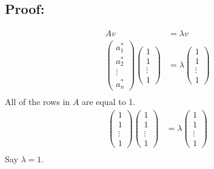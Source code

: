 \documentclass[fleqn]{article}
\begin{document}
\subsection*{Proof: }
\begin{equation*}
    \begin{split}
        Av&=\lambda v\\
        \begin{pmatrix}a^*_1\\a^*_2\\ \vdots \\a^*_n\end{pmatrix}\begin{pmatrix}1\\1\\ \vdots\\1\end{pmatrix}&=\lambda \begin{pmatrix}1\\1\\ \vdots\\1\end{pmatrix}\\
    \end{split}
\end{equation*}
All of the rows in $A$ are equal to 1.
\begin{equation*}
    \begin{split}
        \begin{pmatrix}1\\1\\ \vdots\\1\end{pmatrix}\begin{pmatrix}1\\1\\ \vdots\\1\end{pmatrix}&=\lambda \begin{pmatrix}1\\1\\ \vdots\\1\end{pmatrix}\\
    \end{split}
\end{equation*}
Say $\lambda = 1$.
\end{document}

